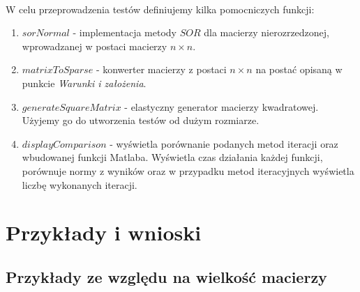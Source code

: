 \documentclass{article}
\begin{document}
\paragraph{}
W celu przeprowadzenia testów definiujemy kilka pomocniczych funkcji:
\begin{enumerate}
\item $sorNormal$ - implementacja metody $SOR$ dla macierzy nierozrzedzonej, wprowadzanej w postaci macierzy $n\times n$.
\item $matrixToSparse$ - konwerter macierzy z postaci $n\times n$ na postać opisaną w punkcie \textit{Warunki i założenia}.
\item $generateSquareMatrix$ - elastyczny generator macierzy kwadratowej. Użyjemy go do utworzenia testów od dużym rozmiarze.
\item $displayComparison$ - wyświetla porównanie podanych metod iteracji oraz wbudowanej funkcji Matlaba. Wyświetla czas działania każdej funkcji, porównuje normy z wyników oraz w przypadku metod iteracyjnych wyświetla liczbę wykonanych iteracji.
\end{enumerate}
\section{Przykłady i wnioski}
\subsection{Przykłady ze względu na wielkość macierzy}
\end{document}
